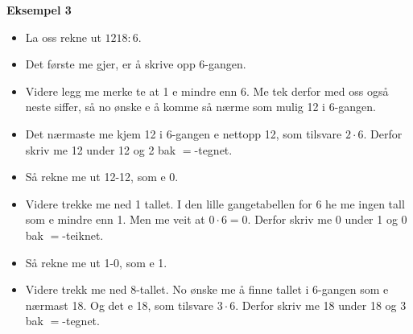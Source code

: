 \documentclass[english,hidelinks,pdftex, 11 pt, class=report,crop=false]{standalone}
\begin{document}
\textbf{Eksempel 3}
\begin{itemize}
\item La oss rekne ut $ 1218:6 $.
\item Det første me gjer, er å skrive opp 6-gangen.
\item Videre legg me merke te at 1 e mindre enn 6. Me tek derfor med oss også neste siffer, så no ønske e å komme så nærme som mulig 12 i 6-gangen.
\item Det nærmaste me kjem 12 i 6-gangen e nettopp 12, som tilsvare $ 2\cdot 6 $. Derfor skriv me 12 under 12 og 2 bak $ = $-tegnet.
\item Så rekne me ut 12-12, som e 0.
\item Videre trekke me ned 1 tallet. I den lille gangetabellen for 6 he me ingen tall som e mindre enn 1. Men me veit at $ 0\cdot6=0 $. Derfor skriv me 0 under 1 og 0 bak $ = $-teiknet.
\item Så rekne me ut 1-0, som e 1.
\item Videre trekk me ned 8-tallet. No ønske me å finne tallet i 6-gangen som e nærmast 18. Og det e 18, som tilsvare $ 3\cdot6 $. Derfor skriv me 18 under 18 og 3 bak $ = $-tegnet.
\end{itemize}
\end{document}
